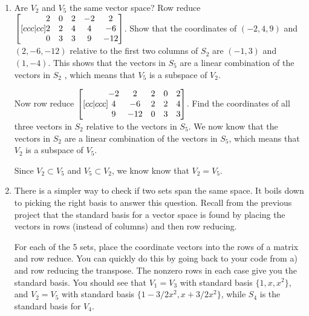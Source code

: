 \begin{enumerate}
\begin{enumerate}
	\item Are $V_2$ and $V_5$ the same vector space? Row reduce 
	$\begin{bmatrix}[ccc|cc]
	\begin{matrix} 2\\2\\0 \end{matrix}
	&\begin{matrix} 0\\2\\3 \end{matrix}
	&\begin{matrix} 2\\4\\3 \end{matrix}
	&\begin{matrix} -2\\4\\9 \end{matrix}
	&\begin{matrix} 2\\-6\\-12 \end{matrix}
	\end{bmatrix}$.  Show that the coordinates of $(-2,4,9)$ and  $(2,-6,-12)$ relative to the first two columns of $S_2$ are $(-1,3)$ and $(1,-4)$.
	This shows that the vectors in $S_5$ are a linear combination of the vectors in $S_2$ , which means that $V_5$ is a subspace of $V_2$.
	  
	Now row reduce  
	$\begin{bmatrix}[cc|ccc]
	\begin{matrix} -2\\4\\9 \end{matrix}
	&\begin{matrix} 2\\-6\\-12 \end{matrix}
	&\begin{matrix} 2\\2\\0 \end{matrix}
	&\begin{matrix} 0\\2\\3 \end{matrix}
	&\begin{matrix} 2\\4\\3 \end{matrix}
	\end{bmatrix}$. Find the coordinates of all three vectors in $S_2$ relative to the vectors in $S_5$.   
	We now know that the vectors in $S_2$ are a linear combination of the vectors in $S_5$, which means that $V_2$ is a subspace of $V_5$.  
	
	Since $V_2\subset V_5$ and $V_5\subset V_2$, we know know that $V_2=V_5$.  
	
	
	\item There is a simpler way to check if two sets span the same space. It boils down to picking the right basis to answer this question. Recall from the previous project that the standard basis for a vector space is found by placing the vectors in rows (instead of columns) and then row reducing. 
	
	For each of the 5 sets, place the coordinate vectors into the rows of a matrix and row reduce. You can quickly do this by going back to your code from a) and row reducing the transpose. The nonzero rows in each case give you the standard basis.  You should see that $V_1=V_3$ with standard basis $\{1,x,x^2\}$, and $V_2=V_5$ with standard basis $\{1-3/2x^2,x+3/2x^2\}$, while $S_4$ is the standard basis for $V_4$.	


\end{enumerate}
\end{enumerate}
